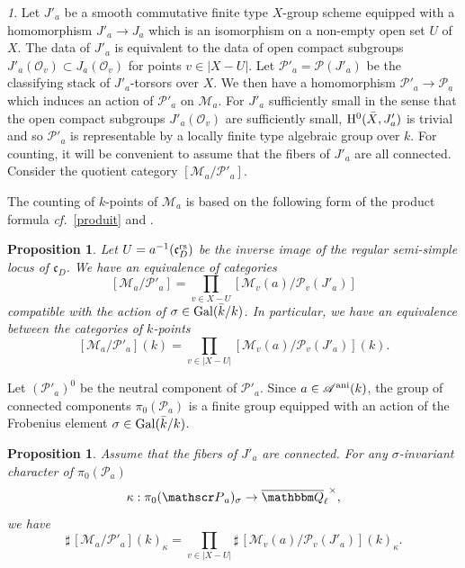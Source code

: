 \documentclass[12pt,english]{smfart}
\numberwithin{equation}{subsection}
\newtheorem{proposition}[equation]{Proposition}
\theoremstyle{remark}
\newtheorem{numero}[equation]{}
\newcommand\calA{{\mathscr A}}
\newcommand\calP{{\mathscr P}}
\newcommand\calM{{\mathscr M}}
\newcommand\calO{{\mathscr O}}
\newcommand\frakc{{\mathfrak c}}
\newcommand\QQ{{\mathbbm Q}}
\newcommand\rmH{{\rm H}}
\newcommand\Gal{{\rm Gal}}
\newcommand\cf{{\it cf.\ }}
\newcommand\rs{{\rm rs}}
\newcommand\ani{{\rm ani}}
\newcommand\Ql{{\overline\QQ_\ell}}
\begin{document}
\begin{numero}\label{choix J'_a}
Let $J'_a$ be a smooth commutative finite type $X$-group scheme equipped
with a homomorphism $J'_a\rightarrow J_a$ which is an isomorphism on a
non-empty open set $U$ of $X$. The data of $J'_a$ is equivalent to the
data of open compact subgroups $J'_a(\calO_v)\subset
J_a(\calO_v)$ for points $v\in |X-U|$. Let $\calP'_a=\calP(J'_a)$ be the
classifying stack of $J'_a$-torsors over $X$. We then have a homomorphism
$\calP'_a\rightarrow \calP_a$ which induces an action of $\calP'_a$ on
$\calM_a$. For $J'_a$ sufficiently small in the sense that the open
compact subgroups $J'_a(\calO_v)$ are sufficiently small, $\rmH^0(\bar X,J'_a)$ is
trivial and so $\calP'_a$ is representable by a locally finite type
algebraic group over $k$. For counting, it will be convenient to assume that
the fibers of $J'_a$ are all connected.
Consider the quotient category $[\calM_a /\calP'_a]$.
\end{numero}

The counting of $k$-points of $\calM_a$ is based on the following form
of the product formula \cf \ref{produit} and \cite[theorem 4.6]{N}.

\begin{proposition}\label{produit quotient}
Let $U=a^{-1}(\frakc_D^\rs)$ be the inverse image of the regular semi-simple
locus of $\frakc_D$. We have an equivalence of categories
$$[\calM_a/ \calP'_a]=\prod_{v\in X-U} [\calM_v(a)/ \calP_v(J'_a)]$$
compatible with the action of $\sigma\in\Gal(\bar k/ k)$. In particular, we have
an equivalence between the categories of $k$-points
$$[\calM_a/ \calP'_a](k)=\prod_{v \in |X-U|} [\calM_v(a)/ \calP_v(J'_a)](k).$$
\end{proposition}

Let $(\calP'_a)^0$ be the neutral component of $\calP'_a$. Since
$a\in\calA^\ani(k)$, the group of connected components $\pi_0(\calP_a)$
is a finite group equipped with an action of the Frobenius element
$\sigma\in\Gal(\bar k/ k)$.


\begin{proposition}
Assume that the fibers of $J'_a$ are connected. For any $\sigma$-invariant
character of $\pi_0(\calP_a)$
$$\kappa:\pi_0(\calP_a)_\sigma\rightarrow \Ql^\times,$$
we have
$$\sharp\,[\calM_a/ \calP'_a](k)_\kappa=\prod_{v \in |X-U|} \sharp\,[\calM_v(a)/ \calP_v(J'_a)](k)_\kappa
.$$
\end{proposition}
\end{document}
